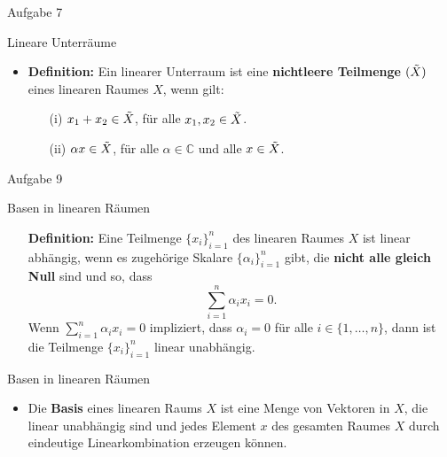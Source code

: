 \documentclass[14pt, aspectratio=169, handout]{beamer}
\begin{document}
\begin{frame}{Aufgabe 7}
\end{frame}

\begin{frame}{Lineare Unterräume}
    \begin{itemize}
        \item \textbf{Definition:} Ein linearer Unterraum ist eine \textbf{nichtleere Teilmenge} $(\Tilde{X})$ eines linearen Raumes $X$, wenn gilt:
        \item[] 
    \item[] \begin{itemize}
                \item[(i)] $x_1 + x_2 \in \Tilde{X}$, für alle $x_1, x_2 \in \Tilde{X}$.
                \item[] 
                \item[(ii)] $\alpha x \in \Tilde{X}$, für alle $\alpha \in \mathbb{C}$ und alle $x\in \Tilde{X}$.
            \end{itemize}
    \end{itemize}
\end{frame}

\begin{frame}{Aufgabe 9} 
\end{frame}

\begin{frame}{Basen in linearen Räumen}
    \begin{itemize}
    \item[] \textbf{Definition:} Eine Teilmenge $\{ x_i\}_{i=1}^n$ des linearen Raumes $X$ ist linear abhängig, wenn es zugehörige Skalare $\{\alpha_i\}_{i=1}^n$ gibt, die \textbf{nicht alle gleich Null} sind und so, dass $$\sum_{i=1}^n \alpha_i x_i = 0.$$ Wenn $\sum_{i=1}^n \alpha_i x_i = 0$ impliziert, dass $\alpha_i = 0$ für alle $i \in \{ 1, \dots, n\}$, dann ist die Teilmenge $\{ x_i\}_{i=1}^n$ linear unabhängig.
\end{itemize}
\end{frame}

\begin{frame}{Basen in linearen Räumen}
    \begin{itemize}
    \item Die \textbf{Basis} eines linearen Raums $X$ ist eine Menge von Vektoren in $X$, die linear unabhängig sind und jedes Element $x$ des gesamten Raumes $X$ durch eindeutige Linearkombination erzeugen können.
\end{itemize}

\end{frame}
\end{document}
